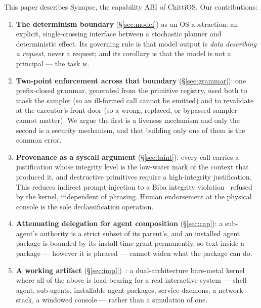 \documentclass[11pt]{article}
\newcommand{\os}{ChittiOS}
\newcommand{\syn}{Synapse}
\begin{document}
This paper describes \syn{}, the capability ABI of \os{}. Our contributions:

\begin{enumerate}[leftmargin=*,itemsep=2pt]
  \item \textbf{The determinism boundary} (\S\ref{sec:model}) as an OS
  abstraction: an explicit, single-crossing interface between a stochastic
  planner and deterministic effect. Its governing rule is that model output is
  \emph{data describing a request}, never a request; and its corollary is that
  the model is not a principal --- the task is.

  \item \textbf{Two-point enforcement across that boundary}
  (\S\ref{sec:grammar}): one prefix-closed grammar, generated from the
  primitive registry, used both to mask the sampler (so an ill-formed call
  cannot be emitted) and to revalidate at the executor's front door (so a
  wrong, replaced, or bypassed sampler cannot matter). We argue the first is a
  liveness mechanism and only the second is a security mechanism, and that
  building only one of them is the common error.

  \item \textbf{Provenance as a syscall argument} (\S\ref{sec:taint}): every
  call carries a justification whose integrity level is the low-water mark of
  the context that produced it, and destructive primitives require a
  high-integrity justification. This reduces indirect prompt injection to a
  Biba integrity violation~\cite{biba1977integrity,fraser2000lomac} refused by
  the kernel, independent of phrasing. Human endorsement at the physical
  console is the sole declassification operation.

  \item \textbf{Attenuating delegation for agent composition}
  (\S\ref{sec:cap}): a sub-agent's authority is a strict subset of its
  parent's, and an installed agent package is bounded by its install-time
  grant permanently, so text inside a package --- however it is phrased ---
  cannot widen what the package can do.

  \item \textbf{A working artifact} (\S\ref{sec:impl})~\cite{chittios}: a
  dual-architecture bare-metal kernel where all of the above is load-bearing for a
  real interactive system --- shell agent, sub-agents, installable agent packages,
  service daemons, a network stack, a windowed console --- rather than a
  simulation of one.
\end{enumerate}
\end{document}

